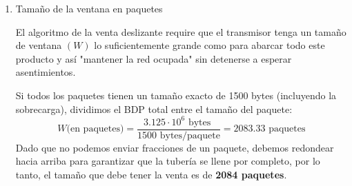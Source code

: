 \begin{enumerate}[label=\color{red}\textbf{\arabic*)}]
\begin{enumerate}[label=\arabic*)]
		            Para aprovechar la serialización y "rellenar el camino de red", es necesario calcular la cantidad de datos en tránsito, lo que se define como $2BD$ (donde $B$ es el ancho de banda y $2D$ es el RTT).
		            \begin{itemize}[label=\textbullet]
			            \item Ancho de banda $(B): 50\mathrm{Mbps}=50\cdot 10^6$ bps.
			            \item Retardo (RTT o $2D$): 0.5 s
		            \end{itemize}
		            Multiplicamos ambos valores para obtener el BDP en bits:
		            \[
			            BDP=50\cdot 10^6\mathrm{bps}\times 0.5\mathrm{s}=25\cdot 10^6\mathrm{bits}=3.125\cdot 10^6\mathrm{bytes}
		            \]
		      \item Tamaño de la ventana en paquetes

		            El algoritmo de la venta deslizante require que el transmisor tenga un tamaño de ventana $(W)$ lo suficientemente grande como para abarcar todo este producto y así "mantener la red ocupada" sin detenerse a esperar asentimientos.

		            Si todos los paquetes tienen un tamaño exacto de 1500 bytes (incluyendo la sobrecarga), dividimos el BDP total entre el tamaño del paquete: \[
			            W\text{(en paquetes)}=\dfrac{3.125\cdot 10^6\text{ bytes }}{1500\text{ bytes/paquete}}=2083.33\text{ paquetes}
		            \]
		            Dado que no podemos enviar fracciones de un paquete, debemos redondear hacia arriba para garantizar que la tubería se llene por completo, por lo tanto, el tamaño que debe tener la venta es de \textbf{2084 paquetes}.
	      \end{enumerate}
\end{enumerate}

